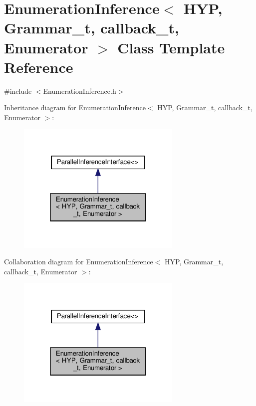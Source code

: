 \hypertarget{class_enumeration_inference}{}\section{Enumeration\+Inference$<$ H\+YP, Grammar\+\_\+t, callback\+\_\+t, Enumerator $>$ Class Template Reference}
\label{class_enumeration_inference}


{\ttfamily \#include $<$Enumeration\+Inference.\+h$>$}



Inheritance diagram for Enumeration\+Inference$<$ H\+YP, Grammar\+\_\+t, callback\+\_\+t, Enumerator $>$\+:
\nopagebreak
\begin{figure}[H]
\begin{center}
\leavevmode
\includegraphics[width=223pt]{class_enumeration_inference__inherit__graph}
\end{center}
\end{figure}


Collaboration diagram for Enumeration\+Inference$<$ H\+YP, Grammar\+\_\+t, callback\+\_\+t, Enumerator $>$\+:
\nopagebreak
\begin{figure}[H]
\begin{center}
\leavevmode
\includegraphics[width=223pt]{class_enumeration_inference__coll__graph}
\end{center}
\end{figure}
